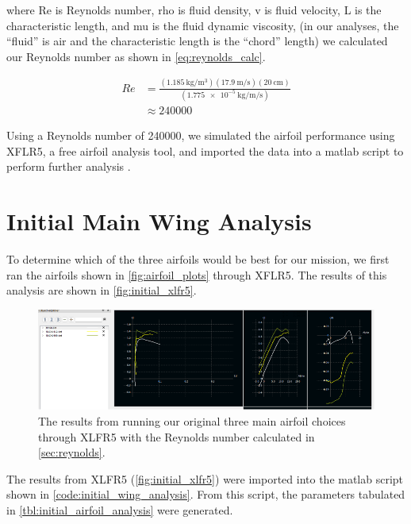 \noindent where \gls{Re} is Reynolds number, \gls{rho} is fluid density, \gls{v} is fluid velocity, \gls{L} is the characteristic length, and \gls{mu} is the fluid dynamic viscosity, (in our analyses, the ``fluid'' is air and the characteristic length is the ``chord'' length) we calculated our Reynolds number as shown in \autoref{eq:reynolds_calc}.

\begin{align}
    Re &= \frac{\left(\qty{1.185}{\kilo\gram\per\meter\cubed}\right)\left(\qty{17.9}{\meter\per\second}\right)\left(\qty{20}{\centi\meter}\right)}{\left(\qty{1.775e-5}{\kilo\gram\per\meter\per\second}\right)}\label{eq:reynolds_calc} \\
    &\approx \num{240000}\nonumber
\end{align}

Using a Reynolds number of \num{240000}, we simulated the airfoil performance using XFLR5, a free airfoil analysis tool, and imported the data into a \acrfull{matlab} script to perform further analysis \citep{techwinder2024,mathworks2024}.

\section{Initial Main Wing Analysis}

To determine which of the three airfoils would be best for our mission, we first ran the airfoils shown in \autoref{fig:airfoil_plots} through XFLR5. The results of this analysis are shown in \autoref{fig:initial_xlfr5}.

\begin{figure}[htpb]
    \centering
    \includegraphics[width=\linewidth]{Figures/main_wing_initial_xlfr5.png}
    \caption[Initial wing XLFR5 analysis results]{The results from running our original three main airfoil choices through XLFR5 with the Reynolds number calculated in \autoref{sec:reynolds}.}
    \label{fig:initial_xlfr5}
\end{figure}

The results from XLFR5 (\autoref{fig:initial_xlfr5}) were imported into the \acrshort{matlab} script shown in \autoref{code:initial_wing_analysis}. From this script, the parameters tabulated in \autoref{tbl:initial_airfoil_analysis} were generated.

